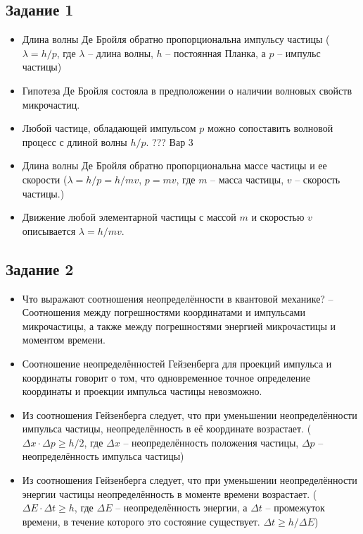 \documentclass[../main.tex]{subfiles}
\begin{document}
\subsection{Задание 1}
\begin{itemize}
    \item Длина волны Де Бройля обратно пропорциональна импульсу частицы ($\lambda = h/p$, где $\lambda$ -- длина волны, $h$ -- постоянная Планка, а $p$ -- импульс частицы)
    \item Гипотеза Де Бройля состояла в предположении о наличии волновых свойств микрочастиц.
    \item Любой частице, обладающей импульсом $p$ можно сопоставить волновой процесс с длиной волны $h/p$. ??? Вар 3
    \item Длина волны Де Бройля обратно пропорциональна массе частицы и ее скорости ($\lambda = h/p = h/mv$, $p = mv$, где $m$ -- масса частицы, $v$ -- скорость частицы.)
    \item Движение любой элементарной частицы с массой $m$ и скоростью $v$ описывается $\lambda = h/mv$.
\end{itemize}

\subsection{Задание 2}
\begin{itemize}
    \item Что выражают соотношения неопределённости в квантовой механике? -- Соотношения между погрешностями координатами и импульсами микрочастицы, а также между погрешностями энергией микрочастицы и моментом времени.
    \item Соотношение неопределённостей Гейзенберга для проекций импульса и координаты говорит о том, что одновременное точное определение координаты и проекции импульса частицы невозможно.
    \item Из соотношения Гейзенберга следует, что при уменьшении неопределённости импульса частицы, неопределённость в её координате возрастает. ($\Delta x \cdot \Delta p \ge h/2$, где $\Delta x$ -- неопределённость положения частицы, $\Delta p$ -- неопределённость импульса частицы)
    \item Из соотношения Гейзенберга следует, что при уменьшении неопределённости энергии частицы неопределённость в моменте времени возрастает. ($\Delta E \cdot \Delta t \ge h$, где $\Delta E$ -- неопределённость энергии, а $\Delta t$ -- промежуток времени, в течение которого это состояние существует. $\Delta t \ge h/\Delta E$)
\end{itemize}
\end{document}
